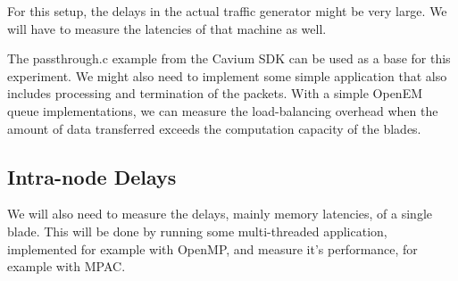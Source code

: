 For this setup, the delays in the actual traffic generator might be very large. We will have to measure the latencies of that machine as well.

The passthrough.c example from the Cavium SDK can be used as a base for this experiment. We might also need to implement some simple application that also includes processing and termination of the packets. With a simple OpenEM queue implementations, we can measure the load-balancing overhead when the amount of data transferred exceeds the computation capacity of the blades.

\subsection{Intra-node Delays}
We will also need to measure the delays, mainly memory latencies, of a single blade. This will be done by running some multi-threaded application, implemented for example with OpenMP, and measure it's performance, for example with MPAC.

